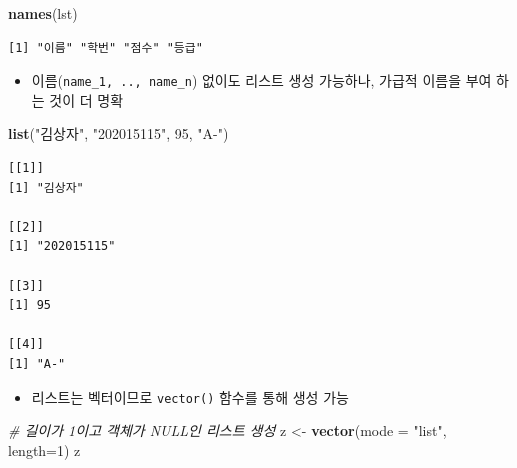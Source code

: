 \documentclass[
  11pt,
]{krantz}
\newenvironment{Shaded}{\begin{snugshade}}{\end{snugshade}}
\newcommand{\CommentTok}[1]{\textcolor[rgb]{0.37,0.37,0.37}{\textit{#1}}}
\newcommand{\DataTypeTok}[1]{\textcolor[rgb]{0.27,0.27,0.27}{#1}}
\newcommand{\DecValTok}[1]{\textcolor[rgb]{0.06,0.06,0.06}{#1}}
\newcommand{\KeywordTok}[1]{\textcolor[rgb]{0.27,0.27,0.27}{\textbf{#1}}}
\newcommand{\NormalTok}[1]{#1}
\newcommand{\StringTok}[1]{\textcolor[rgb]{0.5,0.5,0.5}{#1}}
\providecommand{\tightlist}{%
  \setlength{\itemsep}{0pt}\setlength{\parskip}{0pt}}
\begin{document}
\footnotesize

\begin{Shaded}
\begin{Highlighting}[]
\KeywordTok{names}\NormalTok{(lst)}
\end{Highlighting}
\end{Shaded}

\begin{verbatim}
[1] "이름" "학번" "점수" "등급"
\end{verbatim}

\normalsize

\begin{itemize}
\tightlist
\item
  이름(\texttt{name\_1,\ ..,\ name\_n}) 없이도 리스트 생성 가능하나, 가급적 이름을 부여 하는 것이 더 명확
\end{itemize}

\footnotesize

\begin{Shaded}
\begin{Highlighting}[]
\KeywordTok{list}\NormalTok{(}\StringTok{"김상자"}\NormalTok{, }\StringTok{"202015115"}\NormalTok{, }\DecValTok{95}\NormalTok{, }\StringTok{"A-"}\NormalTok{)}
\end{Highlighting}
\end{Shaded}

\begin{verbatim}
[[1]]
[1] "김상자"

[[2]]
[1] "202015115"

[[3]]
[1] 95

[[4]]
[1] "A-"
\end{verbatim}

\normalsize

\begin{itemize}
\tightlist
\item
  리스트는 벡터이므로 \texttt{vector()} 함수를 통해 생성 가능
\end{itemize}

\footnotesize

\begin{Shaded}
\begin{Highlighting}[]
\CommentTok{# 길이가 1이고 객체가 NULL인 리스트 생성}
\NormalTok{z <-}\StringTok{ }\KeywordTok{vector}\NormalTok{(}\DataTypeTok{mode =} \StringTok{"list"}\NormalTok{, }\DataTypeTok{length=}\DecValTok{1}\NormalTok{)}
\NormalTok{z}
\end{Highlighting}
\end{Shaded}
\end{document}
